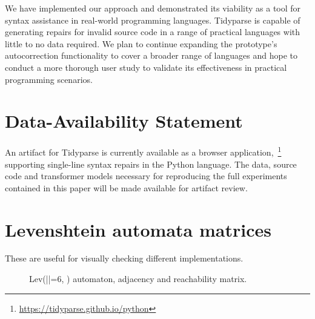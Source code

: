 \documentclass[sigplan,review,acmsmall,nonacm,screen,anonymous]{acmart}\settopmatter{printfolios=false,printccs=false,printacmref=false}
\begin{document}

We have implemented our approach and demonstrated its viability as a tool for syntax assistance in real-world programming languages. Tidyparse is capable of generating repairs for invalid source code in a range of practical languages with little to no data required. We plan to continue expanding the prototype's autocorrection functionality to cover a broader range of languages and hope to conduct a more thorough user study to validate its effectiveness in practical programming scenarios.

\section*{Data-Availability Statement}

An artifact for Tidyparse is currently available as a browser application,~\footnote{\url{https://tidyparse.github.io/python}} supporting single-line syntax repairs in the Python language. The data, source code and transformer models necessary for reproducing the full experiments contained in this paper will be made available for artifact review.

\clearpage

\pagebreak\appendix

\section{Levenshtein automata matrices}

These are useful for visually checking different implementations.

\begin{figure}[H]
\begin{center}
\end{center}
\caption{Lev(|\sigma|=6, ) automaton, adjacency and reachability matrix.}
\end{figure}
\end{document}
